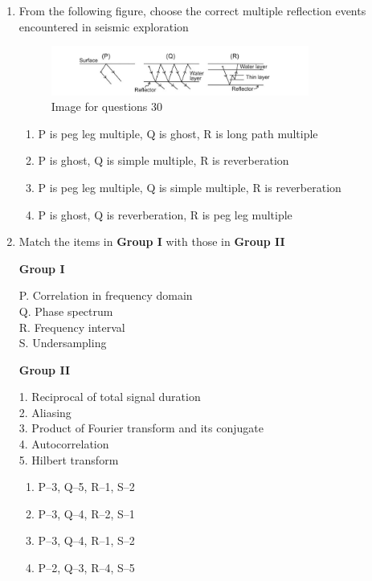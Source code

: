 \documentclass[journal,12pt,onecolumn]{IEEEtran}
\theoremstyle{remark}
\begin{document}
\begin{enumerate}
\item From the following figure, choose the correct multiple reflection events encountered in seismic exploration  

\begin{figure}[H]
    \centering
    \includegraphics[width=0.8\textwidth]{figs/fig5.png}
    \caption{Image for questions 30}
    \label{fig:question30}
\end{figure}

\begin{enumerate}
\item P is peg leg multiple, Q is ghost, R is long path multiple  
\item P is ghost, Q is simple multiple, R is reverberation  
\item P is peg leg multiple, Q is simple multiple, R is reverberation  
\item P is ghost, Q is reverberation, R is peg leg multiple  
\end{enumerate}

\item Match the items in \textbf{Group I} with those in \textbf{Group II}

\begin{multicols}{2}
\textbf{Group I}  
\begin{flushleft}
P. Correlation in frequency domain\\
Q. Phase spectrum\\
R. Frequency interval\\
S. Undersampling
\end{flushleft}

\columnbreak

\textbf{Group II}  
\begin{flushleft}
1. Reciprocal of total signal duration\\
2. Aliasing\\
3. Product of Fourier transform and its conjugate\\
4. Autocorrelation\\
5. Hilbert transform
\end{flushleft}
\end{multicols}

\begin{multicols}{2}
\begin{enumerate}
\item P--3, Q--5, R--1, S--2  
\item P--3, Q--4, R--2, S--1  
\item P--3, Q--4, R--1, S--2  
\item P--2, Q--3, R--4, S--5  
\end{enumerate}
\end{multicols}



\end{enumerate}
\end{document}
